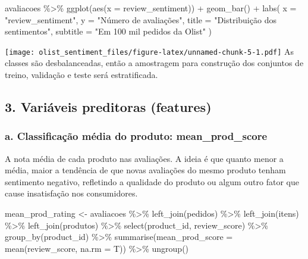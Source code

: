 \documentclass[
]{article}
\newenvironment{Shaded}{\begin{snugshade}}{\end{snugshade}}
\newcommand{\AttributeTok}[1]{\textcolor[rgb]{0.77,0.63,0.00}{#1}}
\newcommand{\FunctionTok}[1]{\textcolor[rgb]{0.00,0.00,0.00}{#1}}
\newcommand{\NormalTok}[1]{#1}
\newcommand{\OtherTok}[1]{\textcolor[rgb]{0.56,0.35,0.01}{#1}}
\newcommand{\SpecialCharTok}[1]{\textcolor[rgb]{0.00,0.00,0.00}{#1}}
\newcommand{\StringTok}[1]{\textcolor[rgb]{0.31,0.60,0.02}{#1}}
\begin{document}
\begin{Shaded}
\begin{Highlighting}[]
\NormalTok{avaliacoes }\SpecialCharTok{\%\textgreater{}\%}
  \FunctionTok{ggplot}\NormalTok{(}\FunctionTok{aes}\NormalTok{(}\AttributeTok{x =}\NormalTok{ review\_sentiment)) }\SpecialCharTok{+} 
  \FunctionTok{geom\_bar}\NormalTok{() }\SpecialCharTok{+} 
  \FunctionTok{labs}\NormalTok{(}
    \AttributeTok{x =} \StringTok{"review\_sentiment"}\NormalTok{,}
    \AttributeTok{y =} \StringTok{"Número de avaliações"}\NormalTok{,}
    \AttributeTok{title =} \StringTok{"Distribuição dos sentimentos"}\NormalTok{,}
    \AttributeTok{subtitle =} \StringTok{"Em 100 mil pedidos da Olist"}
\NormalTok{  )}
\end{Highlighting}
\end{Shaded}

\texttt{[image: olist\_sentiment\_files/figure-latex/unnamed-chunk-5-1.pdf]}
As classes são desbalanceadas, então a amostragem para construção dos
conjuntos de treino, validação e teste será estratificada.

\hypertarget{variuxe1veis-preditoras-features}{%
\subsection{3. Variáveis preditoras
(features)}\label{variuxe1veis-preditoras-features}}

\hypertarget{a.-classificauxe7uxe3o-muxe9dia-do-produto-mean_prod_score}{%
\subsubsection{a. Classificação média do produto:
mean\_prod\_score}\label{a.-classificauxe7uxe3o-muxe9dia-do-produto-mean_prod_score}}

A nota média de cada produto nas avaliações. A ideia é que quanto menor
a média, maior a tendência de que novas avaliações do mesmo produto
tenham sentimento negativo, refletindo a qualidade do produto ou algum
outro fator que cause insatisfação nos consumidores.

\begin{Shaded}
\begin{Highlighting}[]
\NormalTok{mean\_prod\_rating }\OtherTok{\textless{}{-}}\NormalTok{ avaliacoes }\SpecialCharTok{\%\textgreater{}\%}
  \FunctionTok{left\_join}\NormalTok{(pedidos) }\SpecialCharTok{\%\textgreater{}\%}
  \FunctionTok{left\_join}\NormalTok{(itens) }\SpecialCharTok{\%\textgreater{}\%}
  \FunctionTok{left\_join}\NormalTok{(produtos) }\SpecialCharTok{\%\textgreater{}\%}
  \FunctionTok{select}\NormalTok{(product\_id, review\_score) }\SpecialCharTok{\%\textgreater{}\%}
  \FunctionTok{group\_by}\NormalTok{(product\_id) }\SpecialCharTok{\%\textgreater{}\%}
  \FunctionTok{summarise}\NormalTok{(}\AttributeTok{mean\_prod\_score =} \FunctionTok{mean}\NormalTok{(review\_score, }\AttributeTok{na.rm =}\NormalTok{ T)) }\SpecialCharTok{\%\textgreater{}\%}
  \FunctionTok{ungroup}\NormalTok{()}
\end{Highlighting}
\end{Shaded}
\end{document}
